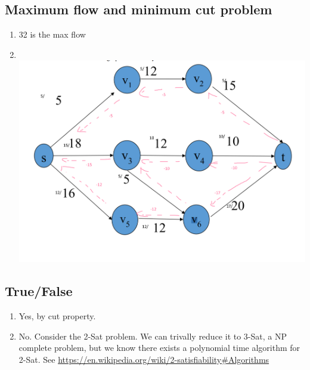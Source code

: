 \documentclass[11pt]{scrartcl}
\begin{document}
\subsection{
	Maximum flow and minimum cut problem
}

\begin{enumerate}[label=\alph*.]
\item {
	32 is the max flow
}

\item{
	\-\\
	\includegraphics[scale=0.5]{graph4a}
}
\end{enumerate}

\subsection{
	True/False
}
\begin{enumerate}[label=\alph*.]
	\item {
		Yes, by cut property. 
	}
	
	\item{
	No. Consider the 2-Sat problem. We can trivally reduce it to 3-Sat, a NP complete problem, but we know 
	there exists a polynomial time algorithm for 2-Sat. See \url{https://en.wikipedia.org/wiki/2-satisfiability#Algorithms}
	}
\end{enumerate}
	
\end{document}
